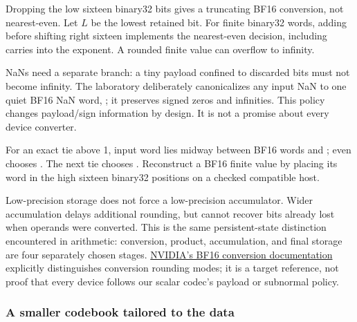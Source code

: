 \hypertarget{05-engine-i-ch001-conversion-must-round-classify-and-declare-its-nan-policy}{}

Dropping the low sixteen binary32 bits gives a truncating BF16 conversion, not nearest-even. Let \(L\) be the lowest retained bit. For finite binary32 words, adding  before shifting right sixteen implements the nearest-even decision, including carries into the exponent. A rounded finite value can overflow to infinity.

NaNs need a separate branch: a tiny payload confined to discarded bits must not become infinity. The laboratory deliberately canonicalizes any input NaN to one quiet BF16 NaN word, ; it preserves signed zeros and infinities. This policy changes payload/sign information by design. It is not a promise about every device converter.

For an exact tie above 1, input word  lies midway between BF16 words  and ; even chooses . The next tie  chooses . Reconstruct a BF16 finite value by placing its word in the high sixteen binary32 positions on a checked compatible host.

Low-precision storage does not force a low-precision accumulator. Wider accumulation delays additional rounding, but cannot recover bits already lost when operands were converted. This is the same persistent-state distinction encountered in arithmetic: conversion, product, accumulation, and final storage are four separately chosen stages. \href{https://docs.nvidia.com/cuda/cuda-math-api/cuda_math_api/group__CUDA__MATH____BFLOAT16__MISC.html}{NVIDIA's BF16 conversion documentation} explicitly distinguishes conversion rounding modes; it is a target reference, not proof that every device follows our scalar codec's payload or subnormal policy.

\subsubsection{A smaller codebook tailored to the data}\label{05-engine-i-ch001-a-smaller-codebook-tailored-to-the-data}

\hypertarget{05-engine-i-ch001-a-smaller-codebook-tailored-to-the-data}{}

